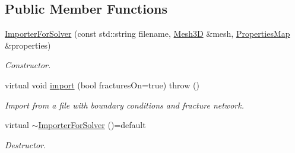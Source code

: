 \subsection*{Public Member Functions}
\begin{DoxyCompactItemize}
\item 
\hyperlink{classFVCode3D_1_1ImporterForSolver_a978935c1e399a5dbc0c21033b32248cd}{Importer\+For\+Solver} (const std\+::string filename, \hyperlink{classFVCode3D_1_1Mesh3D}{Mesh3D} \&mesh, \hyperlink{classFVCode3D_1_1PropertiesMap}{Properties\+Map} \&properties)
\begin{DoxyCompactList}\small\item\em Constructor. \end{DoxyCompactList}\item 
virtual void \hyperlink{classFVCode3D_1_1ImporterForSolver_a4ad5aee92b6abe9b6ed5150c707a83ad}{import} (bool fractures\+On=true)  throw ()
\begin{DoxyCompactList}\small\item\em Import from a file with boundary conditions and fracture network. \end{DoxyCompactList}\item 
virtual \hyperlink{classFVCode3D_1_1ImporterForSolver_a86cfe0148f7a65a3f8a0ef5a877dfd5c}{$\sim$\+Importer\+For\+Solver} ()=default
\begin{DoxyCompactList}\small\item\em Destructor. \end{DoxyCompactList}\end{DoxyCompactItemize}
